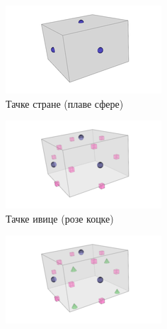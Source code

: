 \documentclass[12pt]{article}
\begin{document}
	\begin{figure}[H]
		\centering
		\begin{subfigure}{0.3\linewidth}
			\includegraphics[width=\linewidth]{slike/Catmull-Clark_Recursive_Step_1.png}
			\caption{Тачке стране (плаве сфере)}
		\end{subfigure}
		\begin{subfigure}{0.3\linewidth}
			\includegraphics[width=\linewidth]{slike/Catmull-Clark_Recursive_Step_2.png}
			\caption{Тачке ивице (розе коцке)}
		\end{subfigure}
		\begin{subfigure}{0.3\linewidth}
			\includegraphics[width=\linewidth]{slike/Catmull-Clark_Recursive_Step_3.png}

\end{subfigure}
\end{figure}
\end{document}
